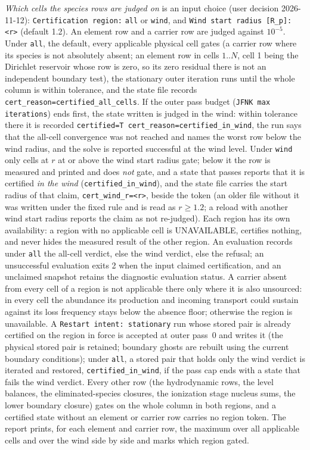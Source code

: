 \documentclass[english,a4paper]{my_memo}
\begin{document}
\emph{Which cells the species rows are judged on} is an input choice (user
decision 2026-11-12): \texttt{Certification region:} \texttt{all} or
\texttt{wind}, and
\texttt{Wind start radius [R\_p]: <r>} (default 1.2). An element row and a
carrier row are judged against $10^{-5}$. Under \texttt{all}, the default,
every applicable physical cell gates (a carrier row where its species is not
absolutely absent; an element row in cells $1..N$, cell 1 being the
Dirichlet reservoir whose row is zero, so its zero residual there is not an
independent boundary test), the stationary outer iteration runs until the
whole column is within tolerance, and the state file records
\texttt{cert\_reason=certified\_all\_cells}. If the outer pass budget
(\texttt{JFNK max iterations}) ends first, the state written is judged in the
wind: within tolerance there it is recorded \texttt{certified=T
cert\_reason=certified\_in\_wind}, the run says that the all-cell
convergence was not reached and names the worst row below the wind radius,
and the solve is reported successful at the wind level. Under \texttt{wind}
only cells at $r$ at or above the wind start radius gate; below it the row is
measured and printed and does \emph{not} gate, and a state that passes
reports that it is certified \emph{in the wind}
(\texttt{certified\_in\_wind}), and the state file carries the start radius
of that claim, \texttt{cert\_wind\_r=<r>}, beside the token (an older file
without it was written under the fixed rule and is read as $r\ge1.2$; a
reload with another wind start radius reports the claim as not re-judged).
Each region has its own availability: a region with no applicable cell is
UNAVAILABLE, certifies nothing, and never hides the measured result of the
other region. An evaluation records under \texttt{all} the all-cell
verdict, else the wind verdict, else the refusal; an unsuccessful
evaluation exits 2 when the input claimed certification, and an unclaimed
snapshot retains the diagnostic evaluation status. A carrier absent from
every cell of a region is not applicable there only where it is also
unsourced: in every cell the abundance its production and incoming transport
could sustain against its loss frequency stays below the absence floor;
otherwise the region is unavailable. A \texttt{Restart intent: stationary}
run whose stored pair is already certified on the region in force is
accepted at outer pass~0 and writes it (the physical stored pair is
retained; boundary ghosts are rebuilt using the current boundary
conditions); under
\texttt{all}, a stored pair that holds only the wind verdict is iterated and
restored, \texttt{certified\_in\_wind}, if the pass cap ends with a state that
fails the wind verdict. Every other row (the
hydrodynamic rows, the level balances, the eliminated-species closures, the
ionization stage nucleus sums, the lower boundary closure) gates on the whole
column in both regions, and a certified state without an element or carrier
row carries no region token. The report prints, for each element and carrier
row, the maximum over all applicable cells and over the wind side by side and
marks which region gated.
\end{document}
